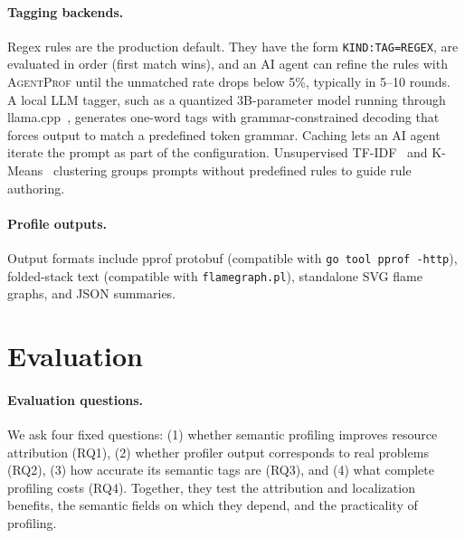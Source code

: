 \documentclass[letterpaper]{article}
\newcommand{\sys}{\textsc{AgentProf}\xspace}
\begin{document}
\paragraph{Tagging backends.}
Regex rules are the production default. They have the form
\texttt{KIND:TAG=REGEX}, are evaluated in order (first match wins),
and an AI agent can refine the rules with \sys until the unmatched rate drops
below 5\%, typically in 5--10 rounds.
A local LLM tagger, such as a quantized 3B-parameter model running through
llama.cpp~\cite{llamacpp}, generates one-word tags with grammar-constrained decoding that
forces output to match a predefined token grammar. Caching lets an AI agent
iterate the prompt as part of the configuration.
Unsupervised TF-IDF~\cite{tfidf} and K-Means~\cite{kmeans} clustering groups prompts without predefined
rules to guide rule authoring.

\paragraph{Profile outputs.}
Output formats include pprof protobuf (compatible with \texttt{go tool pprof -http}), folded-stack text (compatible with \texttt{flamegraph.pl}), standalone SVG flame graphs, and JSON summaries.

\section{Evaluation}
\label{sec:eval}

\paragraph{Evaluation questions.}
We ask four fixed questions: (1) whether semantic profiling improves resource
attribution (RQ1), (2) whether profiler output corresponds to real problems
(RQ2), (3) how accurate its semantic tags are (RQ3), and (4) what complete
profiling costs (RQ4). Together, they test the attribution and localization benefits, the
semantic fields on which they depend, and the practicality of profiling.
\end{document}

